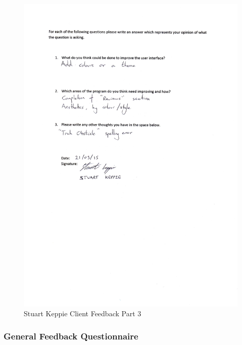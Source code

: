 \begin{itemize}
\begin{figure}[H]
    \includegraphics[width=\textwidth]{./Evaluation/images/StuFeedback3.pdf}
    \caption{Stuart Keppie Client Feedback Part 3} \label{fig:StuFeedback3}
\end{figure}

\subsubsection{General Feedback Questionnaire}


\end{itemize}
